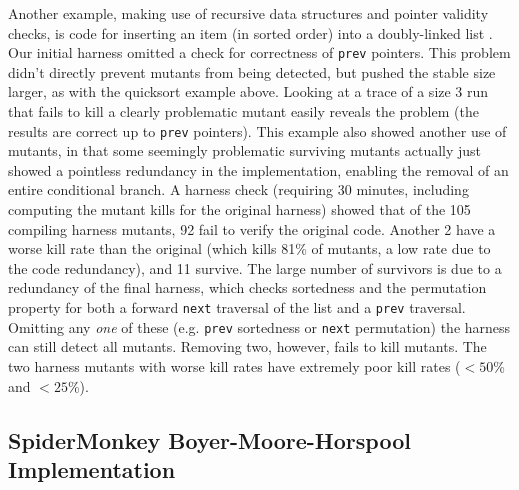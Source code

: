\documentclass[conference]{IEEEtran}
\begin{document}
Another example, making use of recursive data structures and pointer
validity checks, is code for inserting an item (in
sorted order) into a doubly-linked list \cite{DLLInsert}.  Our initial
harness omitted a check for correctness of {\tt prev} pointers.  This
problem didn't directly prevent mutants from being detected, but
pushed the stable size larger, as with the quicksort example above.
Looking at a trace of a size 3 run that fails to kill a clearly
problematic mutant easily reveals the problem (the results are correct
up to {\tt prev} pointers).  This example also showed another use of
mutants, in that some seemingly problematic surviving mutants actually
just showed a pointless redundancy in the implementation, enabling the
removal of an entire conditional branch.  A harness check (requiring
30 minutes, including computing the mutant kills for the original
harness) showed that of the 105 compiling harness mutants, 92 fail to
verify the original code.  Another 2 have a worse kill rate than the
original (which kills 81\% of mutants, a low rate due to the code
redundancy), and 11 survive.  The large number of survivors is due to
a redundancy of the final harness, which checks sortedness and the
permutation property for both a forward {\tt next} traversal of the
list and a {\tt prev} traversal.  Omitting any \emph{one} of these
(e.g. {\tt prev} sortedness or {\tt next} permutation) the harness can
still detect all mutants.  Removing two, however, fails to kill
mutants.  The two harness mutants with worse kill rates have extremely poor
kill rates ($<50$\% and $<25$\%).



\subsection{SpiderMonkey Boyer-Moore-Horspool Implementation}
\end{document}
